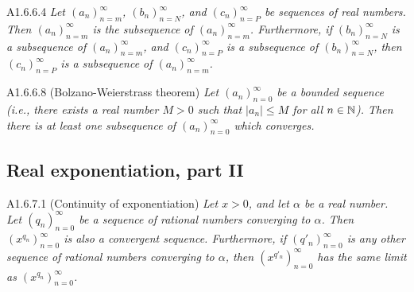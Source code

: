 \begin{lemma}{A1.6.6.4}
    \emph{Let $(a_n)_{n=m}^{\infty}$, $(b_n)_{n=N}^{\infty}$, and $(c_n)_{n=P}^{\infty}$
    be sequences of real numbers. Then $(a_n)_{n=m}^{\infty}$ is the subsequence
    of $(a_n)_{n=m}^{\infty}$. Furthermore, if $(b_n)_{n=N}^{\infty}$ is a subsequence
    of $(a_n)_{n=m}^{\infty}$, and $(c_n)_{n=P}^{\infty}$ is a subsequence of
    $(b_n)_{n=N}^{\infty}$, then $(c_n)_{n=P}^{\infty}$ is a subsequence of
    $(a_n)_{n=m}^{\infty}$.}
\end{lemma}



\begin{theorem}{A1.6.6.8}
    (Bolzano-Weierstrass theorem) \emph{Let $(a_n)_{n=0}^{\infty}$ be a bounded
    sequence (i.e., there exists a real number $M > 0$ such that $|a_n| \leq M$
    for all $n \in \mathbb{N}$). Then there is at least one subsequence of
    $(a_n)_{n=0}^{\infty}$ which converges.}
\end{theorem}

\subsection{Real exponentiation, part II}
\begin{lemma}{A1.6.7.1}
    (Continuity of exponentiation) \emph{Let $x > 0$, and let $\alpha$ be a real
    number. Let $(q_n)_{n=0}^{\infty}$ be a sequence of rational numbers converging
    to $\alpha$. Then $(x^{q_n})_{n=0}^{\infty}$ is also a convergent sequence.
    Furthermore, if $(q'_n)_{n=0}^{\infty}$ is any other sequence of rational numbers
    converging to $\alpha$, then $(x^{q'_n})_{n=0}^{\infty}$ has the same limit
    as $(x^{q_n})_{n=0}^{\infty}$.}
\end{lemma}

